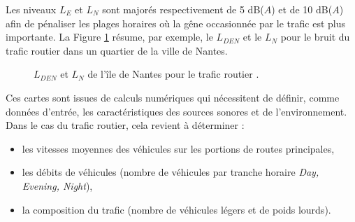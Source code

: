 Les niveaux $L_E$ et $L_N$ sont majorés respectivement de 5 dB($A$) et de 10 dB($A$) afin de pénaliser les plages horaires où la gêne occasionnée par le trafic est plus importante. La Figure \ref{fig:carto_nantes} résume, par exemple, le $L_{DEN}$ et le $L_N$ pour le bruit du trafic routier dans un quartier de la ville de Nantes.

\begin{figure}[t]
\centering
{}
\caption{$L_{DEN}$  et $L_N$  de l'île de Nantes pour le trafic routier \cite{nantes_carte}.}
\label{fig:carto_nantes}
\end{figure}

Ces cartes sont issues de calculs numériques qui nécessitent de définir, comme données d'entrée, les caractéristiques des sources sonores et de l'environnement.  Dans le cas du trafic routier, cela revient à déterminer : 

\begin{itemize}
\item les vitesses moyennes des véhicules sur les portions de routes principales, 
\item les débits de véhicules (nombre de véhicules par tranche horaire \textit{Day, Evening, Night}), 
\item la composition du trafic (nombre de véhicules légers et de poids lourds).\\
\end{itemize}

